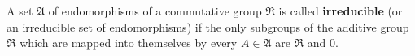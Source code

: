 A set $\mathfrak{A}$ of endomorphisms of a commutative group $\mathfrak{R}$ is called \textbf{irreducible} (or an irreducible set of endomorphisms) if the only subgroups of the additive group $\mathfrak{R}$ which are mapped into themselves by every $A \in \mathfrak{A}$ are $\mathfrak{R}$ and $0$.
